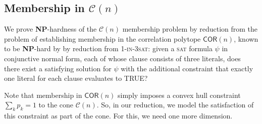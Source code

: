 \documentclass[envcountsect,envcountsame]{svjour3}
\theoremstyle{changebreak}                %
\newcommand{\COR}[1]{\mathsf{COR}(#1)}
\newcommand{\CONX}[1]{\mathcal{C}(#1)}
\begin{document}
\subsection{Membership in $\CONX{n}$}
\label{s:feas}
We prove \textbf{NP}-hardness of the $\CONX{n}$ membership problem by reduction from the problem of establishing membership in the correlation polytope $\mathsf{COR}(n)$, known to be \textbf{NP}-hard by \cite{pitowsky} by reduction from \textsc{1-in-3sat}: given a \textsc{sat} formula $\psi$ in conjunctive normal form, each of whose clause consists of three literals, does there exist a satisfying solution for $\psi$ with the additional constraint that exactly one literal for each clause evaluates to TRUE?

Note that membership in $\COR{n}$ simply imposes a convex hull constraint $\sum_k p_k=1$ to the cone $\CONX{n}$. So, in our reduction, we model the satisfaction of this constraint as part of the cone. For this, we need one more dimension.
\end{document}
